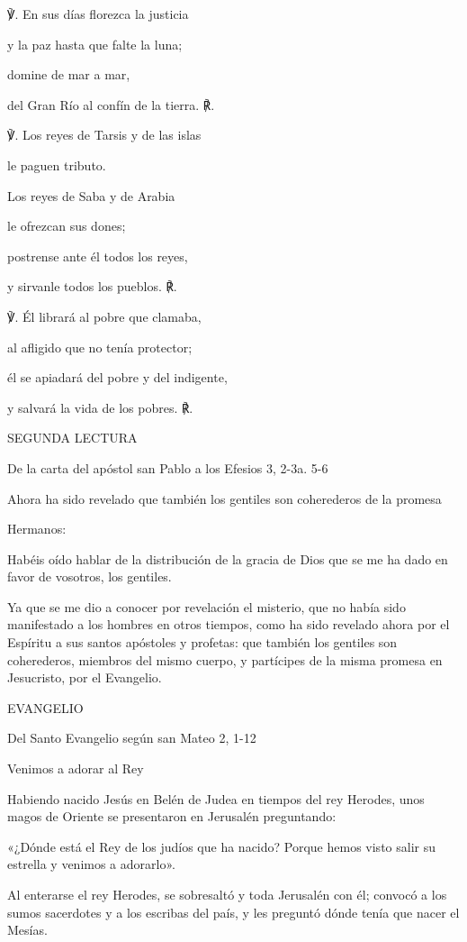 \documentclass[]{article}
\begin{document}
℣. En sus días florezca la justicia

y la paz hasta que falte la luna;

domine de mar a mar,

del Gran Río al confín de la tierra. ℟.

℣. Los reyes de Tarsis y de las islas

le paguen tributo.

Los reyes de Saba y de Arabia

le ofrezcan sus dones;

postrense ante él todos los reyes,

y sirvanle todos los pueblos. ℟.

℣. Él librará al pobre que clamaba,

al afligido que no tenía protector;

él se apiadará del pobre y del indigente,

y salvará la vida de los pobres. ℟.

SEGUNDA LECTURA

De la carta del apóstol san Pablo a los Efesios 3, 2-3a. 5-6

Ahora ha sido revelado que también los gentiles son coherederos de la
promesa

Hermanos:

Habéis oído hablar de la distribución de la gracia de Dios que se me ha
dado en favor de vosotros, los gentiles.

Ya que se me dio a conocer por revelación el misterio, que no había sido
manifestado a los hombres en otros tiempos, como ha sido revelado ahora
por el Espíritu a sus santos apóstoles y profetas: que también los
gentiles son coherederos, miembros del mismo cuerpo, y partícipes de la
misma promesa en Jesucristo, por el Evangelio.

EVANGELIO

Del Santo Evangelio según san Mateo 2, 1-12

Venimos a adorar al Rey

Habiendo nacido Jesús en Belén de Judea en tiempos del rey Herodes, unos
magos de Oriente se presentaron en Jerusalén preguntando:

«¿Dónde está el Rey de los judíos que ha nacido? Porque hemos visto
salir su estrella y venimos a adorarlo».

Al enterarse el rey Herodes, se sobresaltó y toda Jerusalén con él;
convocó a los sumos sacerdotes y a los escribas del país, y les preguntó
dónde tenía que nacer el Mesías.
\end{document}
